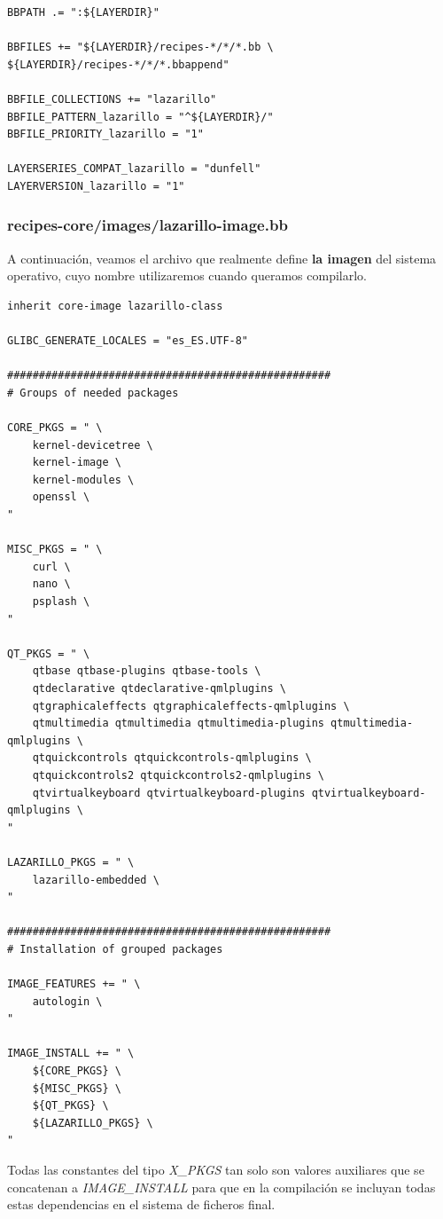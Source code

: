 \begin{lstlisting}
BBPATH .= ":${LAYERDIR}"

BBFILES += "${LAYERDIR}/recipes-*/*/*.bb \
${LAYERDIR}/recipes-*/*/*.bbappend"

BBFILE_COLLECTIONS += "lazarillo"
BBFILE_PATTERN_lazarillo = "^${LAYERDIR}/"
BBFILE_PRIORITY_lazarillo = "1"

LAYERSERIES_COMPAT_lazarillo = "dunfell"
LAYERVERSION_lazarillo = "1"
\end{lstlisting}


\subsubsection{recipes-core/images/lazarillo-image.bb}

A continuación, veamos el archivo que realmente define \textbf{la imagen} del sistema operativo, cuyo nombre utilizaremos cuando queramos compilarlo.

\begin{lstlisting}
inherit core-image lazarillo-class

GLIBC_GENERATE_LOCALES = "es_ES.UTF-8"

###################################################
# Groups of needed packages

CORE_PKGS = " \
	kernel-devicetree \
	kernel-image \
	kernel-modules \
	openssl \
"

MISC_PKGS = " \
	curl \
	nano \
	psplash \
"

QT_PKGS = " \
	qtbase qtbase-plugins qtbase-tools \
	qtdeclarative qtdeclarative-qmlplugins \
	qtgraphicaleffects qtgraphicaleffects-qmlplugins \
	qtmultimedia qtmultimedia qtmultimedia-plugins qtmultimedia-qmlplugins \
	qtquickcontrols qtquickcontrols-qmlplugins \
	qtquickcontrols2 qtquickcontrols2-qmlplugins \
	qtvirtualkeyboard qtvirtualkeyboard-plugins qtvirtualkeyboard-qmlplugins \
"

LAZARILLO_PKGS = " \
	lazarillo-embedded \
"

###################################################
# Installation of grouped packages

IMAGE_FEATURES += " \
	autologin \
"

IMAGE_INSTALL += " \
	${CORE_PKGS} \
	${MISC_PKGS} \
	${QT_PKGS} \
	${LAZARILLO_PKGS} \
"
\end{lstlisting}

Todas las constantes del tipo \emph{X\_PKGS} tan solo son valores auxiliares que se concatenan a \emph{IMAGE\_INSTALL} para que en la compilación se incluyan todas estas dependencias en el sistema de ficheros final.\\


